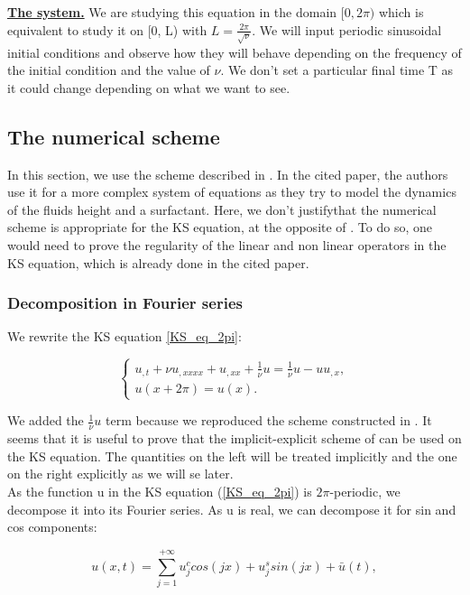 \documentclass[12pt]{article}
\begin{document}
\underline{\textbf{The system.}} We are studying this equation in the domain $[0, 2\pi)$ which is equivalent to study it on [0, L) with $L=\frac{2\pi}{\sqrt{\nu}}$. 
We will input periodic sinusoidal initial conditions and observe how they will behave depending on the frequency of the initial condition and the value of $\nu$. We 
don't set a particular final time T as it could change depending on what we want to see.


\subsection{The numerical scheme}
In this section, we use the scheme described in \cite{Scheme_for_KS}. In the cited paper, the authors use it for a more complex system of equations as they try to 
model the dynamics of the fluids height and a surfactant. Here, we don't justifythat the numerical scheme is appropriate for the KS equation, at the opposite 
of \cite{Scheme_for_KS} .
To do so, one would need to prove the regularity of the linear and non linear operators in the KS equation, which is already done in the cited paper.  

\subsubsection{Decomposition in Fourier series}
We rewrite the KS equation \eqref{KS_eq_2pi}: 

\begin{equation}\label{KS_eq_2pi_1/nu}
\left\{
\begin{aligned}
    u_{,t}  + \nu u_{,xxxx} + u_{,xx} + \frac{1}{\nu}u=\frac{1}{\nu}u -uu_{,x},  \\
    u(x+2\pi)=u(x). 
\end{aligned}
\right.
\end{equation}

We added the $\frac{1}{\nu}u$ term because we reproduced the scheme constructed in \cite{Scheme_for_KS}. It seems that it is useful to prove
 that the implicit-explicit scheme of \cite{KS_scheme_C_A} can be used on the KS equation. The quantities on the left will be treated 
 implicitly and the one on the right explicitly as we will se later.
\\

As the function u in the KS equation (\ref{KS_eq_2pi}) is $2\pi$-periodic, we decompose it into its Fourier series. As u is real, we can 
decompose it for sin and cos components:

\begin{equation}\label{u_Fourier_serie}
    u(x, t) = \sum_{j=1}^{+\infty} u_j^ccos(jx) + u_j^ssin(jx) + \bar{u}(t),
\end{equation}
\end{document}
